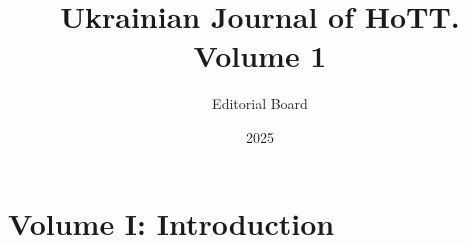 \documentclass[11pt]{book}
\title{Ukrainian Journal of HoTT. Volume 1}
\author{Editorial Board}
\date{2025}
\begin{document}
\tableofcontents

\mainmatter
\chapter{Volume I: Introduction}





\end{document}
